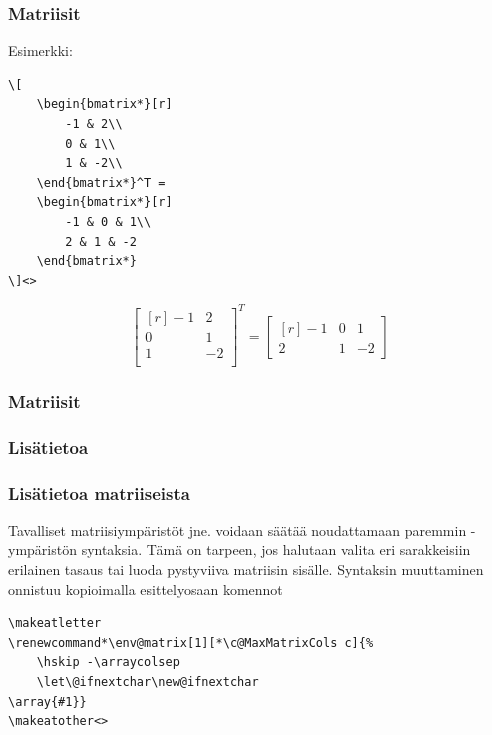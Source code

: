 \begin{frame}[fragile]
    \frametitle{Matriisit}

    Esimerkki:\vaihto
    \begin{minipage}{5cm}
        \begin{lstlisting}
\[
    \begin{bmatrix*}[r]
        -1 & 2\\
        0 & 1\\
        1 & -2\\
    \end{bmatrix*}^T = 
    \begin{bmatrix*}[r]
        -1 & 0 & 1\\
        2 & 1 & -2
    \end{bmatrix*}
\]<>
        \end{lstlisting}
    \end{minipage}
    \begin{minipage}{5cm}
        \[
        \begin{bmatrix*}[r]
            -1 & 2\\
            0 & 1\\
            1 & -2\\
        \end{bmatrix*}^T = 
        \begin{bmatrix*}[r]
            -1 & 0 & 1\\
            2 & 1 & -2
        \end{bmatrix*}
        \]
    \end{minipage}
\end{frame}

\begin{frame}[fragile]
    \frametitle{Matriisit}
    
\end{frame}

\subsubsection{Lisätietoa}
\begin{frame}[fragile]
    \frametitle{Lisätietoa matriiseista}
    Tavalliset matriisiympäristöt  jne. voidaan säätää noudattamaan paremmin -ympäristön syntaksia.
    \vaihto
    Tämä on tarpeen, jos halutaan valita eri sarakkeisiin erilainen tasaus tai luoda pystyviiva matriisin sisälle. 
    \vaihto
    Syntaksin muuttaminen onnistuu kopioimalla esittelyosaan komennot\vaihto
    \begin{lstlisting}
\makeatletter
\renewcommand*\env@matrix[1][*\c@MaxMatrixCols c]{%
    \hskip -\arraycolsep
    \let\@ifnextchar\new@ifnextchar
\array{#1}}
\makeatother<>
    \end{lstlisting}
\end{frame}

